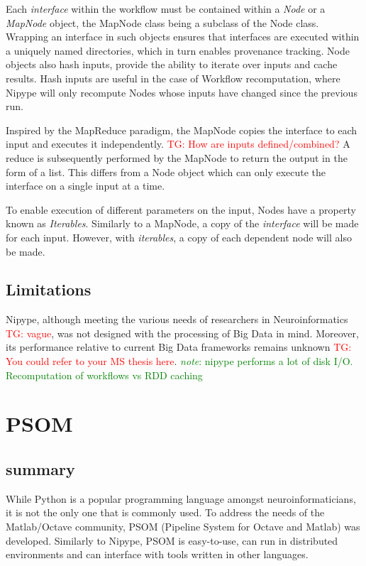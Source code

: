 \documentclass{report}
\newcommand{\note}[1]{\textcolor{green}{\textit{note}: #1}}
\newcommand{\tristan}[1]{\textcolor{red}{TG: #1}}
\begin{document}
		 Each \textit{interface} within the workflow must be
                 contained within a \textit{Node} or a
                 \textit{MapNode} object, the MapNode class being a
                 subclass of the Node class. Wrapping an interface in
                 such objects ensures that interfaces are executed
                 within a uniquely named directories, which in turn
                 enables provenance tracking. Node objects also hash
                 inputs, provide the ability to iterate over inputs
                 and cache results. Hash inputs are useful in the case
                 of Workflow recomputation, where Nipype will only
                 recompute Nodes whose inputs have changed since the
                 previous run.
		
		Inspired by the MapReduce paradigm, the MapNode copies
                the interface to each input and executes it
                independently. \tristan{How are inputs defined/combined?} A reduce is subsequently performed by
                the MapNode to return the output in the form of a
                list. This differs from a Node object which can only
                execute the interface on a single input at a time.
		
		To enable execution of different parameters on the
                input, Nodes have a property known as
                \textit{Iterables}. Similarly to a MapNode, a copy of
                the \textit{interface} will be made for each
                input. However, with \textit{iterables}, a copy of
                each dependent node will also be made.
		 
		\subsection{Limitations}
		Nipype, although meeting the various needs of
                researchers in Neuroinformatics \tristan{vague}, was
                not designed with the processing of Big Data in
                mind. Moreover, its performance relative to current
                Big Data frameworks remains unknown \tristan{You could
                  refer to your MS thesis here}.  \note{nipype
                  performs a lot of disk I/O. Recomputation of
                  workflows vs RDD caching}
		
    \section{PSOM} 
        \subsection{summary} 
        While Python is a popular programming language amongst
neuroinformaticians, it is not the only one that is commonly used. To address
the needs of the Matlab/Octave community, PSOM (Pipeline System for Octave and
Matlab) was developed. Similarly to Nipype, PSOM is easy-to-use, can run in
distributed environments and can interface with tools written in other
languages.
\end{document}
